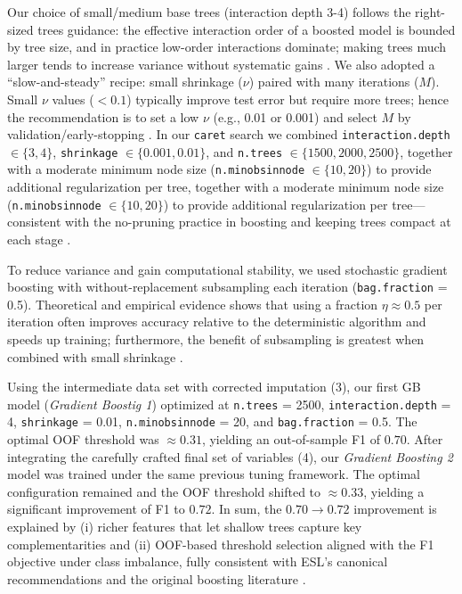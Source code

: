 \documentclass[12pt,a4paper,onecolumn]{article}
\begin{document}
Our choice of small/medium base trees (interaction depth 3-4) follows the right-sized trees guidance: the effective interaction order of a boosted model is bounded by tree size, and in practice low-order interactions dominate; making trees much larger tends to increase variance without systematic gains \citep{HastieTibshiraniFriedman2009}. We also adopted a ``slow-and-steady'' recipe: small shrinkage ($\nu$) paired with many iterations ($M$). Small $\nu$ values ($<0.1$) typically improve test error but require more trees; hence the recommendation is to set a low $\nu$ (e.g., 0.01 or 0.001) and select $M$ by validation/early-stopping \citep{HastieTibshiraniFriedman2009,Friedman2001,Friedman2002}. In our \texttt{caret} search we combined \texttt{interaction.depth} $\in \{3,4\}$, \texttt{shrinkage} $\in \{0.001, 0.01\}$, and \texttt{n.trees} $\in \{1500, 2000, 2500\}$, together with a moderate minimum node size (\texttt{n.minobsinnode} $\in \{10, 20\}$) to provide additional regularization per tree, together with a moderate minimum node size (\texttt{n.minobsinnode} $\in \{10, 20\}$) to provide additional regularization per tree---consistent with the no-pruning practice in boosting and keeping trees compact at each stage \citep{HastieTibshiraniFriedman2009}.

To reduce variance and gain computational stability, we used stochastic gradient boosting with without-replacement subsampling each iteration (\texttt{bag.fraction} = 0.5). Theoretical and empirical evidence shows that using a fraction $\eta \approx 0.5$ per iteration often improves accuracy relative to the deterministic algorithm and speeds up training; furthermore, the benefit of subsampling is greatest when combined with small shrinkage \citep{Friedman2002,HastieTibshiraniFriedman2009}.

Using the intermediate data set with corrected imputation (3), our first GB model (\textit{Gradient Boostig 1}) optimized at \texttt{n.trees} = 2500, \texttt{interaction.depth} = 4, \texttt{shrinkage} = 0.01, \texttt{n.minobsinnode} = 20, and \texttt{bag.fraction} = 0.5. The optimal OOF threshold was $\approx 0.31$, yielding an out-of-sample F1 of $0.70$. After integrating the carefully crafted final set of variables (4), our \textit{Gradient Boosting 2} model was trained under the same previous tuning framework. The optimal configuration remained and the OOF threshold shifted to $\approx 0.33$, yielding a significant improvement of F1 to $0.72$. In sum, the $0.70 \rightarrow 0.72$ improvement is explained by (i) richer features that let shallow trees capture key complementarities and (ii) OOF-based threshold selection aligned with the F1 objective under class imbalance, fully consistent with ESL’s canonical recommendations and the original boosting literature \citep{HastieTibshiraniFriedman2009,Friedman2001,Friedman2002}.
\end{document}
